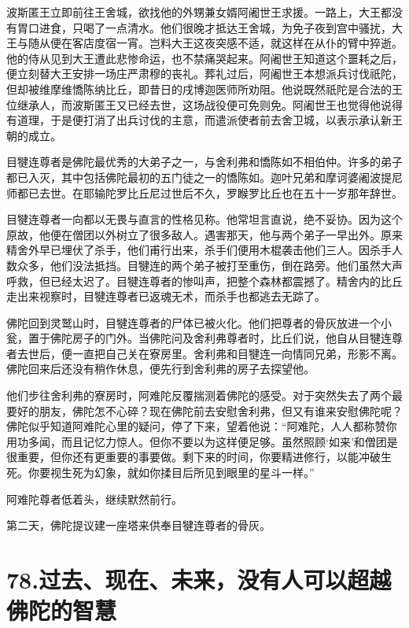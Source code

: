 \documentclass[12pt,twoside,openany]{book}
\begin{document}
波斯匿王立即前往王舍城，欲找他的外甥兼女婿阿阇世王求援。一路上，大王都没有胃口进食，只喝了一点清水。他们很晚才抵达王舍城，为免子夜到宫中骚扰，大王与随从便在客店度宿一宵。岂料大王这夜突感不适，就这样在从仆的臂中猝逝。他的侍从见到大王遭此悲惨命运，也不禁痛哭起来。阿阇世王知道这个噩耗之后，便立刻替大王安排一场庄严肃穆的丧礼。葬礼过后，阿阇世王本想派兵讨伐祇陀，但却被维摩维憍陈纳比丘，即昔日的戌博迦医师所劝阻。他说既然祇陀是合法的王位继承人，而波斯匿王又已经去世，这场战役便可免则免。阿阇世王也觉得他说得有道理，于是便打消了出兵讨伐的主意，而遣派使者前去舍卫城，以表示承认新王朝的成立。

目犍连尊者是佛陀最优秀的大弟子之一，与舍利弗和憍陈如不相伯仲。许多的弟子都已入灭，其中包括佛陀最初的五门徒之一的憍陈如。迦叶兄弟和摩诃婆阇波提尼师都已去世。在耶输陀罗比丘尼过世后不久，罗睺罗比丘也在五十一岁那年辞世。

目犍连尊者一向都以无畏与直言的性格见称。他常坦言直说，绝不妥协。因为这个原故，他便在僧团以外树立了很多敌人。遇害那天，他与两个弟子一早出外。原来精舍外早已埋伏了杀手，他们甫行出来，杀手们便用木棍袭击他们三人。因杀手人数众多，他们没法抵挡。目犍连的两个弟子被打至重伤，倒在路旁。他们虽然大声呼救，但已经太迟了。目犍连尊者的惨叫声，把整个森林都震撼了。精舍内的比丘走出来视察时，目犍连尊者已返魂无术，而杀手也都逃去无踪了。

佛陀回到灵鹫山时，目犍连尊者的尸体已被火化。他们把尊者的骨灰放进一个小瓮，置于佛陀房子的门外。当佛陀问及舍利弗尊者时，比丘们说，他自从目犍连尊者去世后，便一直把自己关在寮房里。舍利弗和目犍连一向情同兄弟，形影不离。佛陀回来后还没有稍作休息，便先行到舍利弗的房子去探望他。

他们步往舍利弗的寮房时，阿难陀反覆揣测着佛陀的感受。对于突然失去了两个最要好的朋友，佛陀怎不心碎？现在佛陀前去安慰舍利弗，但又有谁来安慰佛陀呢？佛陀似乎知道阿难陀心里的疑问，停了下来，望着他说：“阿难陀，人人都称赞你用功多闻，而且记忆力惊人。但你不要以为这样便足够。虽然照顾‘如来’和僧团是很重要，但你还有更重要的事要做。剩下来的时间，你要精进修行，以能冲破生死。你要视生死为幻象，就如你揉目后所见到眼里的星斗一样。”

阿难陀尊者低着头，继续默然前行。

第二天，佛陀提议建一座塔来供奉目犍连尊者的骨灰。


\chapter{78.过去、现在、未来，没有人可以超越佛陀的智慧}\label{ch78}
\end{document}
